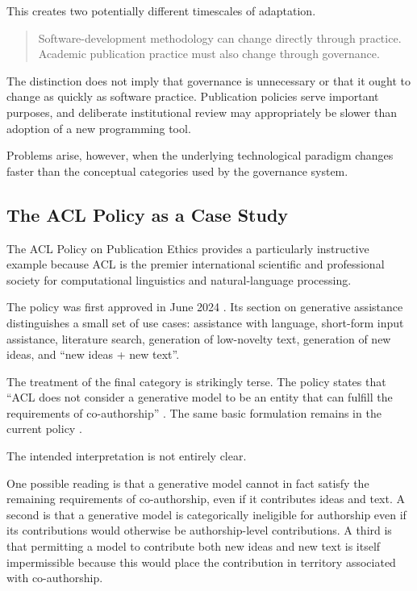 \documentclass[12pt]{article}
\begin{document}
This creates two potentially different timescales of adaptation.

\begin{quote}
Software-development methodology can change directly through practice. Academic publication practice must also change through governance.
\end{quote}

The distinction does not imply that governance is unnecessary or that it ought to change as quickly as software practice. Publication policies serve important purposes, and deliberate institutional review may appropriately be slower than adoption of a new programming tool.

Problems arise, however, when the underlying technological paradigm changes faster than the conceptual categories used by the governance system.


\subsection{The ACL Policy as a Case Study}

The ACL Policy on Publication Ethics provides a particularly instructive example because ACL is the premier international scientific and professional society for computational linguistics and natural-language processing.

The policy was first approved in June 2024 \citep{acl2024policy}. Its section on generative assistance distinguishes a small set of use cases: assistance with language, short-form input assistance, literature search, generation of low-novelty text, generation of new ideas, and ``new ideas + new text''.

The treatment of the final category is strikingly terse. The policy states that ``ACL does not consider a generative model to be an entity that can fulfill the requirements of co-authorship'' \citep{acl2024policy}. The same basic formulation remains in the current policy \citep{acl2026policy}.

The intended interpretation is not entirely clear.

One possible reading is that a generative model cannot in fact satisfy the remaining requirements of co-authorship, even if it contributes ideas and text. A second is that a generative model is categorically ineligible for authorship even if its contributions would otherwise be authorship-level contributions. A third is that permitting a model to contribute both new ideas and new text is itself impermissible because this would place the contribution in territory associated with co-authorship.
\end{document}
